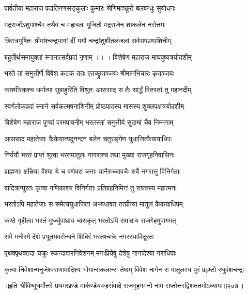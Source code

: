 \twolineshloka
{पार्वतीया महाराज पदातिगणसङ्कुलाः}
{कुमारः श्रेणिमाञ्छूरो बलबन्धुः सुयोधनः}%

\twolineshloka
{मद्रराजोंऽशुमांश्चैव तथैव च महाबलः}
{पूजितो मद्रराजेन शाकलेन नरोत्तमः}%

\twolineshloka
{त्रिरात्रमुषितः श्रीमांश्चन्द्रभागां दीं ययौ}
{चन्द्रांशुशीतलजलां सर्वपापप्रणाशिनीम्} %

\twolineshloka
{बहुतीर्थसमायुक्तां स्नानात्सर्वप्रदां नृणाम् ।। ।}
{विशेषेण महाराज माघपुष्यत्रयोदशीम्}%

\twolineshloka
{भरते तां समुत्तीर्णे विवेश कटकं ततः}
{एतच्छ्रुतञ्जयः श्रीमानभिचारः कृतञ्जयः}%

\twolineshloka
{काश्मीरकश्च धर्मात्मा सुबाहुरिति विश्रुतः}
{आससाद स तैः सार्द्धं वितस्तां तु महानदीम्}%

\twolineshloka
{स्वर्गलोकप्रदां स्नाने सर्वकल्मषनाशिनीम्}
{प्रोष्ठपादस्य मासस्य शुक्लपक्षत्रयोदशीम्}%

\twolineshloka
{विशेषेण महाराज पुण्यां परमपावनीम्}
{भरतस्तां समुत्तीर्य सुदामां चैव निम्नगाम्}%

\twolineshloka
{आससाद महातेजाः कैकेयान्यदुनन्दन}
{बलेन चतुरङ्गेण युधाजित्कैकयाधिपः}%

\twolineshloka
{निर्ययौ भरतं प्राप्तं श्रुत्वा भरतमातुलः}
{नागराश्च तथा मुख्या राजगृहनिवासिनः}%

\twolineshloka
{ब्राह्मणाः क्षत्त्रिया वैश्या ये च वर्णवरा जनाः}
{यानैरुच्चावचैः सर्वै नगरात्तु विनिर्गताः}%

\twolineshloka
{वादित्रान्पुरतः कृत्वा गणिकाश्च विनिर्गताः}
{प्रतिग्रहनिमित्तं तु राघवस्य महात्मनः}%

\twolineshloka
{भरतोऽपि महातेजाः स समेत्ययुधाजिता}
{अभ्यधावत तत्प्रीत्या मातुलं कैकयाधिपम्} %

\twolineshloka
{कण्ठे गृहीत्वा भरतं मूर्ध्न्युपाघ्राय चासकृत्}
{भरतोऽपि समादाय राजगेहमुपागमत्}%

\twolineshloka
{समे मनोरमे देशे प्रभूतयवसेन्धने}
{शिबिरं भरतश्चक्रे नगरस्याविदूरतः}%

\twolineshloka
{पृथक्पृथक्तदा चक्रुः स्कन्दावारनिवेशनम्}
{मनःप्रियेषु देशेषु नानादेश्या नराधिपाः}%

\twolineshloka
{कृत्वा निवेशान्मनुजेश्वराणामादिश्य भोगान्सकलान्स तेषाम्}
{विवेश नागेन स मातुलस्य पुरं प्रहृष्टो रघुवंशचन्द्रः}%

॥इति श्रीविष्णुधर्मोत्तरे प्रथमखण्डे मार्कण्डेयवज्रसंवादे राजगृहगमनो नाम सप्तोत्तरद्विशततमोऽध्यायः॥२०७॥

